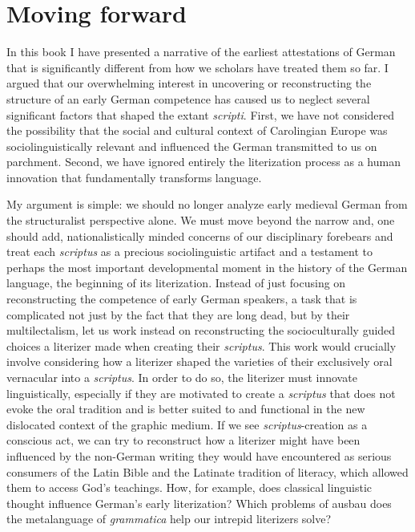\chapter{Moving forward}\label{sec:chap:8}

In this book I have presented a narrative of the earliest attestations of German that is significantly different from how we scholars have treated them so far. I argued that our overwhelming interest in uncovering or reconstructing the structure of an early German competence has caused us to neglect several significant factors that shaped the extant \textit{scripti}. First, we have not considered the possibility that the social and cultural context of Carolingian Europe was sociolinguistically relevant and influenced the German transmitted to us on parchment. Second, we have ignored entirely the literization process as a human innovation that fundamentally transforms language.

My argument is simple: we should no longer analyze early medieval German from the structuralist perspective alone. We must move beyond the narrow and, one should add, nationalistically minded concerns of our disciplinary forebears and treat each \textit{scriptus} as a precious sociolinguistic artifact and a testament to perhaps the most important developmental moment in the history of the German language, the beginning of its literization. Instead of just focusing on reconstructing the competence of early German speakers, a task that is complicated not just by the fact that they are long dead, but by their multilectalism, let us work instead on reconstructing the socioculturally guided choices a literizer made when creating their \textit{scriptus}.  This work would crucially involve considering how a literizer shaped the varieties of their exclusively oral vernacular into a \textit{scriptus}. In order to do so, the literizer must innovate linguistically, especially if they are motivated to create a \textit{scriptus} that does not evoke the oral tradition and is better suited to and functional in the new dislocated context of the graphic medium. If we see \textit{scriptus}{}-creation as a conscious act, we can try to reconstruct how a literizer might have been influenced by the non-German writing they would have encountered as serious consumers of the Latin Bible and the Latinate tradition of literacy, which allowed them to access God’s teachings. How, for example, does classical linguistic thought influence German’s early literization? Which problems of ausbau does the metalanguage of \textit{grammatica} help our intrepid literizers solve?

